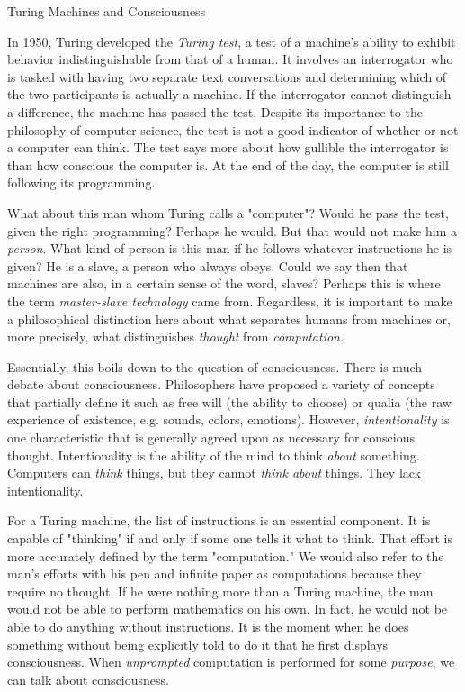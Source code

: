 
\begin{bluebox}{Turing Machines and Consciousness}

    In 1950, Turing developed the \textit{Turing test}, a test of a machine's ability to exhibit behavior indistinguishable from that of a human. It involves an interrogator who is tasked with having two separate text conversations and determining which of the two participants is actually a machine. If the interrogator cannot distinguish a difference, the machine has passed the test. Despite its importance to the philosophy of computer science, the test is not a good indicator of whether or not a computer can think. The test says more about how gullible the interrogator is than how conscious the computer is. At the end of the day, the computer is still following its programming.
        
    What about this man whom Turing calls a "computer"? Would he pass the test, given the right programming? Perhaps he would. But that would not make him a \textit{person}. What kind of person is this man if he follows whatever instructions he is given? He is a slave, a person who always obeys. Could we say then that machines are also, in a certain sense of the word, slaves? Perhaps this is where the term \textit{master-slave technology} came from. Regardless, it is important to make a philosophical distinction here about what separates humans from machines or, more precisely, what distinguishes \textit{thought} from \textit{computation}.
        
    Essentially, this boils down to the question of consciousness. There is much debate about consciousness. Philosophers have proposed a variety of concepts that partially define it such as free will (the ability to choose) or qualia (the raw experience of existence, e.g. sounds, colors, emotions). However, \textit{intentionality} is one characteristic that is generally agreed upon as necessary for conscious thought. Intentionality is the ability of the mind to think \textit{about} something. Computers can \textit{think} things, but they cannot \textit{think about} things. They lack intentionality.
        
    For a Turing machine, the list of instructions is an essential component. It is capable of "thinking" if and only if some one tells it what to think. That effort is more accurately defined by the term "computation." We would also refer to the man's efforts with his pen and infinite paper as computations because they require no thought. If he were nothing more than a Turing machine, the man would not be able to perform mathematics on his own. In fact, he would not be able to do anything without instructions. It is the moment when he does something without being explicitly told to do it that he first displays consciousness. When \textit{unprompted} computation is performed for some \textit{purpose}, we can talk about consciousness.
        

\end{bluebox}
